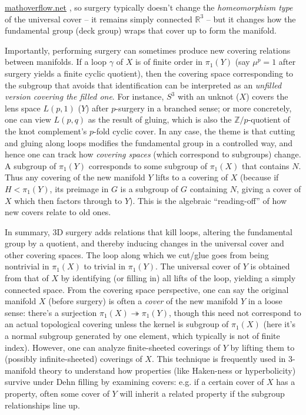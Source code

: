 \documentclass[11pt]{article}
\theoremstyle{remark}
\begin{document}
\href{https://mathoverflow.net/questions/321640/homology-sphere-with-mathbbr3-as-the-universal-cover#:~:text=Homology%20sphere%20with%20,there%20do%20exist%20integer}{mathoverflow.net}
, so surgery typically doesn’t change the \textit{homeomorphism type} of the universal cover – it remains simply connected $\mathbb{R}^3$ – but it changes how the fundamental group (deck group) wraps that cover up to form the manifold.

Importantly, performing surgery can sometimes produce new covering relations between manifolds. If a loop $\gamma$ of $X$ is of finite order in $\pi_1(Y)$ (say $\mu^p=1$ after surgery yields a finite cyclic quotient), then the covering space corresponding to the subgroup that avoids that identification can be interpreted as an \textit{unfilled version covering the filled one}. For instance, $S^3$ with an unknot ($X$) covers the lens space $L(p,1)$ ($Y$) after $p$-surgery in a branched sense; or more concretely, one can view $L(p,q)$ as the result of gluing, which is also the $\mathbb{Z}/p$-quotient of the knot complement’s $p$-fold cyclic cover. In any case, the theme is that cutting and gluing along loops modifies the fundamental group in a controlled way, and hence one can track how \textit{covering spaces} (which correspond to subgroups) change. A subgroup of $\pi_1(Y)$ corresponds to some subgroup of $\pi_1(X)$ that contains $N$. Thus any covering of the new manifold $Y$ lifts to a covering of $X$ (because if $H<\pi_1(Y)$, its preimage in $G$ is a subgroup of $G$ containing $N$, giving a cover of $X$ which then factors through to $Y$). This is the algebraic “reading-off” of how new covers relate to old ones.

In summary, 3D surgery adds relations that kill loops, altering the fundamental group by a quotient, and thereby inducing changes in the universal cover and other covering spaces. The loop along which we cut/glue goes from being nontrivial in $\pi_1(X)$ to trivial in $\pi_1(Y)$. The universal cover of $Y$ is obtained from that of $X$ by identifying (or filling in) all lifts of the loop, yielding a simply connected space. From the covering space perspective, one can say the original manifold $X$ (before surgery) is often a \textit{cover} of the new manifold $Y$ in a loose sense: there’s a surjection $\pi_1(X) \twoheadrightarrow \pi_1(Y)$, though this need not correspond to an actual topological covering unless the kernel is subgroup of $\pi_1(X)$ (here it’s a normal subgroup generated by one element, which typically is not of finite index). However, one can analyze finite-sheeted coverings of $Y$ by lifting them to (possibly infinite-sheeted) coverings of $X$. This technique is frequently used in 3-manifold theory to understand how properties (like Haken-ness or hyperbolicity) survive under Dehn filling by examining covers: e.g. if a certain cover of $X$ has a property, often some cover of $Y$ will inherit a related property if the subgroup relationships line up.
\end{document}

